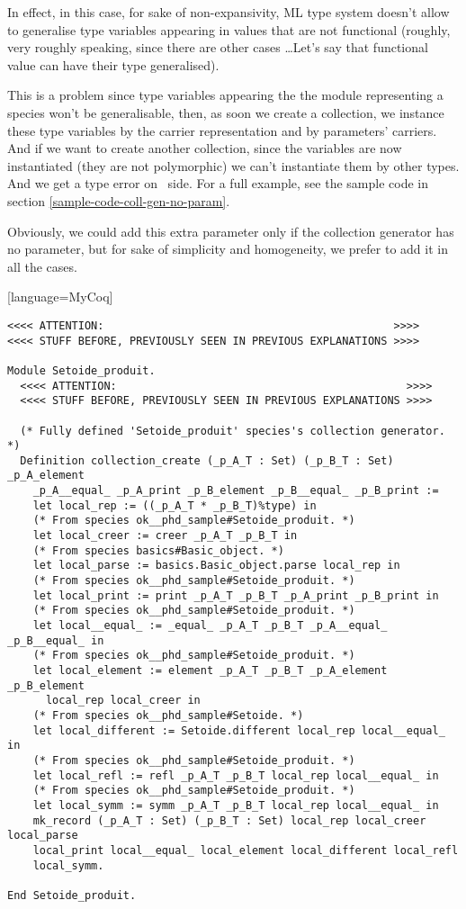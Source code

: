 In effect, in this case, for sake of non-expansivity, ML type system
doesn't allow to generalise type variables appearing in values that
are not functional (roughly, very roughly speaking, since there are
other cases \ldots Let's say that functional value can have their
type generalised).

This is a problem since type variables appearing the the module
representing a species won't be generalisable, then, as soon we create
a collection, we instance these type variables by the carrier
representation and by parameters' carriers. And if we want to create
another collection, since the variables are now instantiated (they are
not polymorphic) we can't instantiate them by other types. And we get
a type error on \ocaml\ side. For a full example, see the sample code
in section \ref{sample-code-coll-gen-no-param}.

Obviously, we could add this extra parameter only if the collection
generator has no parameter, but for sake of simplicity and
homogeneity, we prefer to add it in all the cases.


{\footnotesize[language=MyCoq]
\begin{lstlisting}
<<<< ATTENTION:                                             >>>>
<<<< STUFF BEFORE, PREVIOUSLY SEEN IN PREVIOUS EXPLANATIONS >>>>

Module Setoide_produit.
  <<<< ATTENTION:                                             >>>>
  <<<< STUFF BEFORE, PREVIOUSLY SEEN IN PREVIOUS EXPLANATIONS >>>>

  (* Fully defined 'Setoide_produit' species's collection generator. *)
  Definition collection_create (_p_A_T : Set) (_p_B_T : Set) _p_A_element
    _p_A__equal_ _p_A_print _p_B_element _p_B__equal_ _p_B_print :=
    let local_rep := ((_p_A_T * _p_B_T)%type) in
    (* From species ok__phd_sample#Setoide_produit. *)
    let local_creer := creer _p_A_T _p_B_T in
    (* From species basics#Basic_object. *)
    let local_parse := basics.Basic_object.parse local_rep in
    (* From species ok__phd_sample#Setoide_produit. *)
    let local_print := print _p_A_T _p_B_T _p_A_print _p_B_print in
    (* From species ok__phd_sample#Setoide_produit. *)
    let local__equal_ := _equal_ _p_A_T _p_B_T _p_A__equal_ _p_B__equal_ in
    (* From species ok__phd_sample#Setoide_produit. *)
    let local_element := element _p_A_T _p_B_T _p_A_element _p_B_element
      local_rep local_creer in
    (* From species ok__phd_sample#Setoide. *)
    let local_different := Setoide.different local_rep local__equal_ in
    (* From species ok__phd_sample#Setoide_produit. *)
    let local_refl := refl _p_A_T _p_B_T local_rep local__equal_ in
    (* From species ok__phd_sample#Setoide_produit. *)
    let local_symm := symm _p_A_T _p_B_T local_rep local__equal_ in
    mk_record (_p_A_T : Set) (_p_B_T : Set) local_rep local_creer local_parse
    local_print local__equal_ local_element local_different local_refl
    local_symm.
  
End Setoide_produit.
\end{lstlisting}
}

